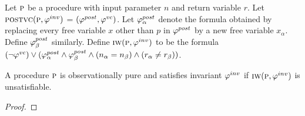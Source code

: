 Let $\textsc{p}$ be a procedure with input parameter $n$ and return variable $r$.
Let $\textsc{postvc}({\textsc{p}},{\varphi^{inv}})$ = $(\varphi^{post},\varphi^{vc})$.
Let $\varphi^{post}_\alpha$ denote the formula obtained by replacing every free variable $x$ other than $p$ in $\varphi^{post}$
by a new free variable $x_\alpha$. Define $\varphi^{post}_\beta$ similarly.
Define $\textsc{iw}(\textsc{p}, \varphi^{inv})$ to be the formula $(\neg \varphi^{vc}) \vee (\varphi^{post}_\alpha \wedge \varphi^{post}_\beta \wedge (n_\alpha = n_\beta) \wedge (r_\alpha \neq r_\beta))$.

\begin{theorem}
A procedure $\textsc{p}$ is observationally pure and satisfies invariant $\varphi^{inv}$
if $\textsc{iw}(\textsc{p}, \varphi^{inv})$ is unsatisfiable.
\end{theorem}

\begin{proof}
%
%
%
\end{proof}